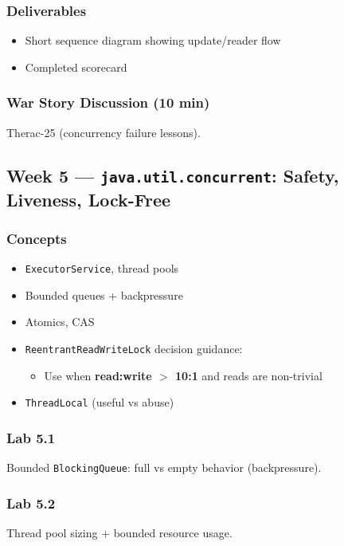 \documentclass[11pt,a4paper]{article}
\begin{document}
	\subsubsection*{Deliverables}
	\begin{itemize}[leftmargin=*]
		\item Short sequence diagram showing update/reader flow
		\item Completed scorecard
	\end{itemize}
	
	\subsubsection*{War Story Discussion (10 min)}
	Therac-25 (concurrency failure lessons).
	
	\subsection*{Week 5 --- \texttt{java.util.concurrent}: Safety, Liveness, Lock-Free}
	
	\subsubsection*{Concepts}
	\begin{itemize}[leftmargin=*]
		\item \texttt{ExecutorService}, thread pools
		\item Bounded queues + backpressure
		\item Atomics, CAS
		\item \texttt{ReentrantReadWriteLock} decision guidance:
		\begin{itemize}[leftmargin=*]
			\item Use when \textbf{read:write $>$ 10:1} and reads are non-trivial
		\end{itemize}
		\item \texttt{ThreadLocal} (useful vs abuse)
	\end{itemize}
	
	\subsubsection*{Lab 5.1}
	Bounded \texttt{BlockingQueue}: full vs empty behavior (backpressure).
	
	\subsubsection*{Lab 5.2}
	Thread pool sizing + bounded resource usage.
	
\end{document}
